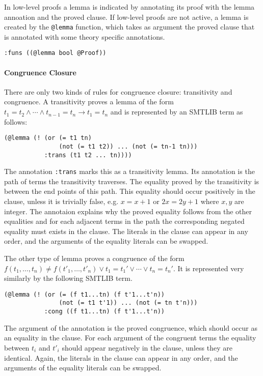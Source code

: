 \documentclass[a4paper]{article}
\begin{document}
In low-level proofs a lemma is indicated by annotating its proof with
the lemma annoation and the proved clause.  If low-level proofs are
not active, a lemma is created by the \verb+@lemma+ function, which
takes as argument the proved clause that is annotated with some theory
specific annotations.
\begin{verbatim}
:funs ((@lemma bool @Proof))
\end{verbatim}

\paragraph{Congruence Closure}

There are only two kinds of rules for congruence closure: transitivity
and congruence.  A transitivity proves a lemma of the form ${t_1 = t_2}
\land \cdots\land {t_{n-1}= t_n} \rightarrow {t_1 = t_n}$ and is
represented by an SMTLIB term as follows:

\begin{verbatim}
(@lemma (! (or (= t1 tn)
               (not (= t1 t2)) ... (not (= tn-1 tn)))
           :trans (t1 t2 ... tn))))
\end{verbatim}

The annotation \verb+:trans+ marks this as a transitivity lemma.  Its
annotation is the path of terms the transitivity traverses.  The
equality proved by the transitivity is between the end points of this
path.  This equality should occur positively in the clause, unless it
is trivially false, e.g. $x = x+1$ or $2x = 2y+1$ where $x,y$ are
integer.  The annotaion explains why the proved equality follows from
the other equalities and for each adjacent terms in the path the
corresponding negated equality must exists in the clause.  The
literals in the clause can appear in any order, and the arguments of
the equality literals can be swapped.

The other type of lemma proves a congruence of the form $f(t_1, \dots,
t_n)\neq f(t'_1,\dots,t'_n) \lor t_1=t_1' \lor \cdots \lor t_n=t_n'$.
It is represented very similarly by the following SMTLIB term.

\begin{verbatim}
(@lemma (! (or (= (f t1...tn) (f t'1...t'n))
               (not (= t1 t'1)) ... (not (= tn t'n)))
           :cong ((f t1...tn) (f t'1...t'n))
\end{verbatim}

The argument of the annotation is the proved congruence, which should
occur as an equality in the clause.  For each argument of the
congruent terms the equality between $t_i$ and $t'_i$ should appear
negatively in the clause, unless they are identical.  Again, the
literals in the clause can appear in any order, and the arguments of
the equality literals can be swapped.
\end{document}
